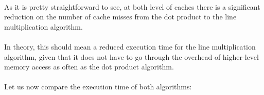 \documentclass{report}
\begin{document}
				\paragraph{}As it is pretty straightforward to see, at both level of caches there is a significant reduction on the number of cache misses from the dot product to the line multiplication algorithm.
				
				\paragraph{}In theory, this should mean a reduced execution time for the line multiplication algorithm, given that it does not have to go through the overhead of higher-level memory access as often as the dot product algorithm.
				
				\paragraph{}Let us now compare the execution time of both algorithms:
			
\end{document}
